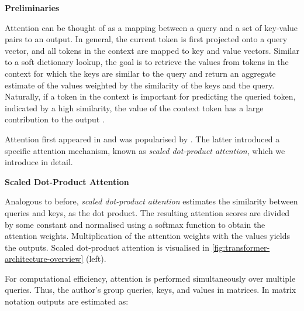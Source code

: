 \textbf{Preliminaries}

Attention can be thought of as a mapping between a query and a set of key-value pairs to an output. In general, the current token is first projected onto a query vector, and all tokens in the context are mapped to key and value vectors. Similar to a soft dictionary lookup, the goal is to retrieve the values from tokens in the context for which the keys are similar to the query and return an aggregate estimate of the values weighted by the similarity of the keys and the query. Naturally, if a token in the context is important for predicting the queried token, indicated by a high similarity, the value of the context token has a large contribution to the output \autocites[][5]{phuongFormalAlgorithmsTransformers2022}[][3]{vaswaniAttentionAllYou2017}.

Attention first appeared in \textcite[][4]{bahdanauNeuralMachineTranslation2016} and was popularised by \textcite[][4]{vaswaniAttentionAllYou2017}. The latter introduced a specific attention mechanism, known as \emph{scaled dot-product attention}, which we introduce in detail.

\textbf{Scaled Dot-Product Attention}

Analogous to before, \emph{scaled dot-product attention} estimates the similarity between queries and keys, as the dot product. The resulting attention scores are divided by some constant and normalised using a softmax function to obtain the attention weights. Multiplication of the attention weights with the values yields the outputs. Scaled dot-product attention is visualised in \cref{fig:transformer-architecture-overview} (left).

For computational efficiency, attention is performed simultaneously over multiple queries. Thus, the author's group queries, keys, and values in matrices. In matrix notation outputs are estimated as:

